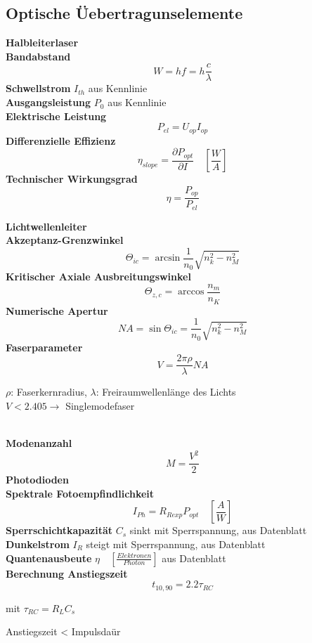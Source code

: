 \documentclass[12pt,a4paper,oneside]{article}
\begin{document}
\subsection*{Optische Üebertragunselemente}
\begin{multicols}{2}
\textbf{Halbleiterlaser}\\
\textbf{Bandabstand} $$W  = h f = h \frac{c}{\lambda}$$
\textbf{Schwellstrom} $I_{th}$ aus Kennlinie\\
\textbf{Ausgangsleistung} $P_0$ aus Kennlinie\\
\textbf{Elektrische Leistung} $$P_{el} = U_{op} I_{op}$$
\textbf{Differenzielle Effizienz}$$ \eta_{slope} = \frac{\partial P_{opt}}{\partial I} \quad [\frac{W}{A}]$$
\textbf{Technischer Wirkungsgrad} $$\eta = \frac{P_{op}}{P_{el}}$$

\textbf{Lichtwellenleiter} \\
\textbf{Akzeptanz-Grenzwinkel} $$\Theta_{ic}= \arcsin\frac{1}{n_0}\sqrt{n_k^2-n_M^2}$$
\textbf{Kritischer Axiale Ausbreitungswinkel }$$\Theta_{z,c}=\arccos\frac{n_m}{n_K}$$
\textbf{Numerische Apertur }$$NA = \sin \Theta_{ic} = \frac{1}{n_0}\sqrt{n_k^2-n_M^2}$$
\textbf{Faserparameter} $$V=\frac{2 \pi \rho}{\lambda} NA$$
\begin{tiny} $\rho$: Faserkernradius, $\lambda$: Freiraumwellenlänge des Lichts \\ $V<2.405 \rightarrow$ Singlemodefaser\end{tiny}\\
\textbf{Modenanzahl} $$M = \frac{V^2}{2}$$
\textbf{Photodioden}\\
\textbf{Spektrale Fotoempfindlichkeit}
$$I_{Ph} = R_{Rexp} P_{opt} \quad [\frac{A}{W}]$$
\textbf{Sperrschichtkapazität} $C_s$ sinkt mit Sperrspannung, aus Datenblatt \\
\textbf{Dunkelstrom} $I_R$ steigt mit Sperrspannung, aus Datenblatt \\
\textbf{Quantenausbeute} $\eta \quad [\frac{Elektronen}{Photon}]$ aus Datenblatt\\
\textbf{Berechnung Anstiegszeit} $$t_{10,90} = 2.2 \tau_{RC}$$ \begin{tiny} mit $\tau_{RC} = R_L C_s$\end{tiny} Anstiegszeit < Impulsdaür\\

 \end{multicols}
\end{document}
